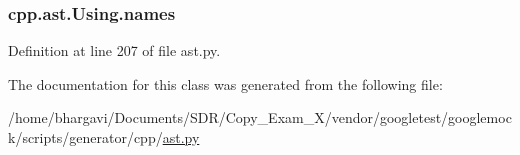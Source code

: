 \subsubsection[{\texorpdfstring{names}{names}}]{\setlength{\rightskip}{0pt plus 5cm}cpp.\+ast.\+Using.\+names}\hypertarget{classcpp_1_1ast_1_1_using_abc05dedb59eb83857d373cc0e64eccb3}{}\label{classcpp_1_1ast_1_1_using_abc05dedb59eb83857d373cc0e64eccb3}


Definition at line 207 of file ast.\+py.



The documentation for this class was generated from the following file\+:\begin{DoxyCompactItemize}
\item 
/home/bhargavi/\+Documents/\+S\+D\+R/\+Copy\+\_\+\+Exam\+\_\+X/vendor/googletest/googlemock/scripts/generator/cpp/\hyperlink{ast_8py}{ast.\+py}\end{DoxyCompactItemize}
